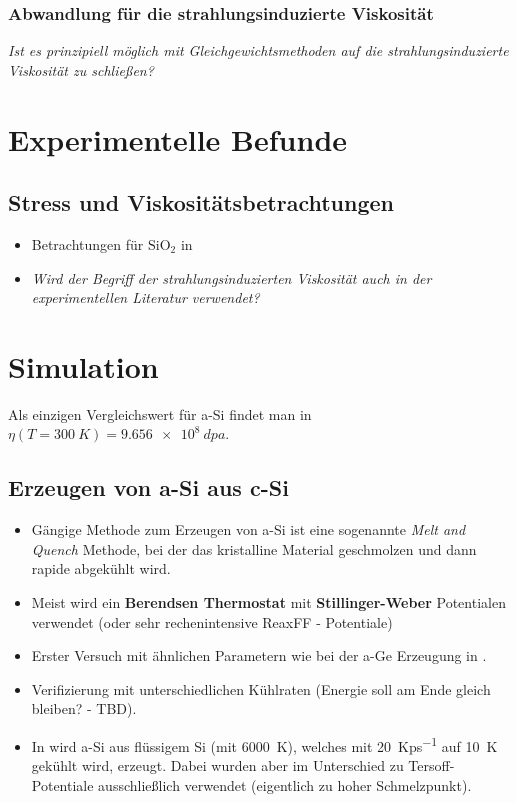 \documentclass[a4paper, 10pt, 
               numbers=noenddot, toc=graduated,
               headsepline=true, footsepline=true,
               twoside=false, titlepage=true, 
               bibliography=totoc]{scrartcl}
\begin{document}
	\subsubsection{Abwandlung für die strahlungsinduzierte Viskosität}
	\textit{Ist es prinzipiell möglich mit Gleichgewichtsmethoden auf die strahlungsinduzierte Viskosität zu schließen?}

\section{Experimentelle Befunde}

\subsection{Stress und Viskositätsbetrachtungen}
	\begin{itemize}
		\item Betrachtungen für $\mathrm{SiO_2}$ in \cite{Snoeks2000}
		\item \textit{Wird der Begriff der strahlungsinduzierten Viskosität auch in der experimentellen Literatur verwendet?}
	\end{itemize}

\section{Simulation}

Als einzigen Vergleichswert für a-Si findet man in \cite{Vauth2007} $\eta(T=\SI{300}{K}) = \SI{9.656e8}{dpa}$.

\subsection{Erzeugen von a-Si aus c-Si}
	\begin{itemize}
		\item Gängige Methode zum Erzeugen von a-Si ist eine sogenannte \textit{Melt and Quench} Methode, bei der das kristalline Material geschmolzen und dann rapide abgekühlt wird.
		\item Meist wird ein \textbf{Berendsen Thermostat} mit \textbf{Stillinger-Weber} Potentialen verwendet (oder sehr rechenintensive ReaxFF - Potentiale)
		\item Erster Versuch mit ähnlichen Parametern wie bei der a-Ge Erzeugung in \cite{Mayr2005}.
		\item Verifizierung mit unterschiedlichen Kühlraten (Energie soll am Ende gleich bleiben? - TBD).
		\item In \cite{Vauth2007} wird a-Si aus flüssigem Si (mit \SI{6000}{K}), welches mit \SI{20}{Kps^{-1}} auf \SI{10}{K} gekühlt wird, erzeugt. Dabei wurden aber im Unterschied zu \cite{Mayr2005} Tersoff-Potentiale ausschließlich verwendet (eigentlich zu hoher Schmelzpunkt).
	\end{itemize}
\end{document}
